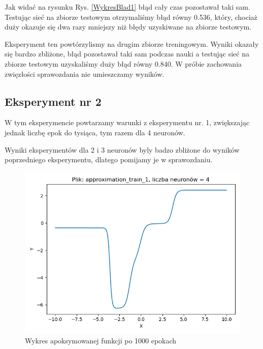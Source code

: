 \documentclass[12pt]{article}
\begin{document}
\newpage
Jak widać na rysunku Rys. \ref{WykresBlad1} błąd cały czas pozostawał taki sam.\\

Testując sieć na zbiorze testowym otrzymaliśmy błąd równy 0.536, który, chociaż duży okazuje się dwa razy mniejszy niż błędy uzyskiwane na zbiorze testowym.

Eksperyment ten powtórzylismy na drugim zbiorze treningowym. Wyniki okazały się bardzo zbliżone, błąd pozostawał taki sam podczas nauki a testując sieć na zbiorze testowym uzyskaliśmy duży błąd równy 0.840.  W próbie zachowania zwięzłości sprawozdania nie umieszczamy wyników.

\newpage

\subsection{Eksperyment nr 2}
W tym eksperymencie powtarzamy warunki z eksperymentu nr. 1, zwiększając jednak liczbę epok do tysiąca, tym razem dla 4 neuronów. 

Wyniki eksperymentów dla 2 i 3 neuronów byly badzo zbliżone do wyników poprzedniego eksperymentu, dlatego pomijamy je w sprawozdaniu.

\begin{figure}[!htb]
 \centering
 \includegraphics[width=12cm]{FunctionPlot4Neuron.png}
 \caption{Wykres apoksymowanej funkcji po 1000 epokach}
 \vspace{-0.3cm}
 \label{WykresFun2}
\end{figure}
\end{document}
